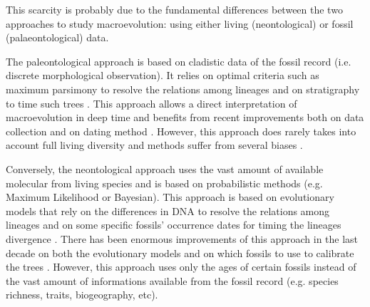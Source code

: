 
This scarcity %
is probably due to the fundamental differences between the two approaches to study macroevolution: using either living (neontological) or fossil (palaeontological) data.

The paleontological approach%
 is based on cladistic data of the fossil record (i.e. discrete morphological observation).
It relies on optimal criteria such as maximum parsimony \citep{Hennig1966,felsenstein2004} to resolve the relations among lineages and on stratigraphy to time such trees \citep{GoloboffTNT}.
This approach allows a direct interpretation of macroevolution in deep time and benefits from recent improvements both on data collection \citep[e.g. 4541 characters in][introducing the term ``phenomics'']{O'Leary08022013} and on dating method \citep[e.g. the \textit{cal3} method from][]{Bapst2014}.
However, this approach does rarely takes into account full living diversity \citep[e.g. only 38 out of 351 living primates for 119 fossil in][]{ni2013oldest} and methods suffer from several biases \citep[e.g. parsimony;][]{wrightbayesian2014}.

Conversely, the neontological approach uses the vast amount of available molecular from living species and is based on probabilistic methods (e.g. Maximum Likelihood or Bayesian).
This approach is based on evolutionary models that rely on the differences in DNA to resolve the relations among lineages and on some specific fossils' occurrence dates for timing the lineages divergence \citep[i.e. the molecular clock;][]{zuckerkandl1965}.
There has been enormous improvements of this approach in the last decade on both the evolutionary models \citep[e.g.][]{bapsta2013,stadlerdating2013,heaththe2013} and on which fossils to use to calibrate the trees \citep{Donoghue2007424,Parham01032012}.
However, this approach uses only the ages of certain fossils instead of the vast amount of informations available from the fossil record (e.g. species richness, traits, biogeography, etc).


